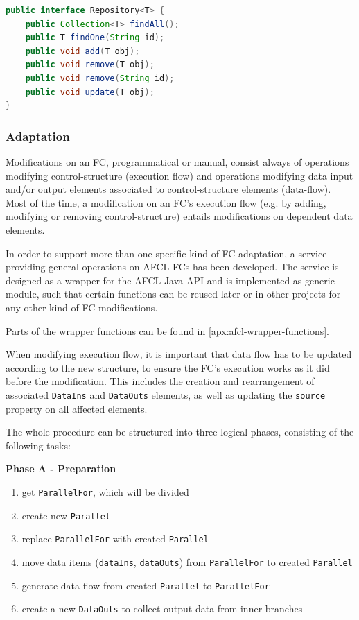 \documentclass[a4paper,top=25mm,bottom=25mm,12pt,pdftex,halfparskip,twoside,openany,bibtotoc,numbers=noenddot]{scrbook}
\begin{document}
\vspace{0.25cm}
\begin{lstlisting}[language=Java, caption=Repository Interface, label={lst:repository-interface}]
public interface Repository<T> {
    public Collection<T> findAll();
    public T findOne(String id);
    public void add(T obj);
    public void remove(T obj);
    public void remove(String id);
    public void update(T obj);
}
\end{lstlisting}

\newpage

\subsubsection{Adaptation}
\label{sec:backend-adaptation}

Modifications on an FC, programmatical or manual, consist always of operations modifying control-structure (execution flow) and operations modifying data input and/or output elements associated to control-structure elements (data-flow). Most of the time, a modification on an FC's execution flow (e.g. by adding, modifying or removing control-structure) entails modifications on dependent data elements.

In order to support more than one specific kind of FC adaptation, a service providing general operations on AFCL FCs has been developed. The service is designed as a wrapper for the AFCL Java API and is implemented as generic module, such that certain functions can be reused later or in other projects for any other kind of FC modifications.

Parts of the wrapper functions can be found in \ref{apx:afcl-wrapper-functions}.

When modifying execution flow, it is important that data
 flow has to be updated according to the new structure, to ensure the FC's execution works as it did before the modification. This includes the creation and rearrangement of associated \texttt{DataIns} and \texttt{DataOuts} elements, as well as updating the \texttt{source} property on all affected elements. 

The whole procedure can be structured into three logical phases, consisting of the following tasks:

\vspace{0.8cm}

\textbf{Phase A - Preparation}
\begin{enumerate}
\item get \texttt{ParallelFor}, which will be divided
\item create new \texttt{Parallel}
\item replace \texttt{ParallelFor} with created \texttt{Parallel}
\item move data items (\texttt{dataIns}, \texttt{dataOuts}) from \texttt{ParallelFor} to created \texttt{Parallel}
\item generate data-flow from created \texttt{Parallel} to \texttt{ParallelFor}
\item create a new \texttt{DataOuts} to collect output data from inner branches
\end{enumerate}
\vspace{0.8cm}
\clearpage
\end{document}
